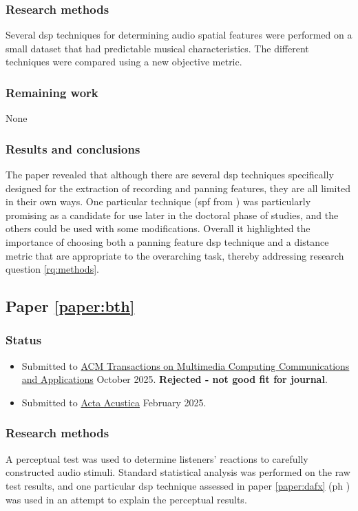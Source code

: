 \documentclass[a4paper]{article}
\begin{document}
\begin{refsection}
\subsubsection*{Research methods}
Several \gls{dsp} techniques for determining audio spatial features were performed on a small dataset that had predictable musical characteristics. The different techniques were compared using a new objective metric.

\subsubsection*{Remaining work}
None

\subsubsection*{Results and conclusions}
The paper revealed that although there are several \gls{dsp} techniques specifically designed for the extraction of recording and panning features, they are all limited in their own ways. One particular technique (\gls{spf} from \cite{tzanetakisStereoPanningFeatures2007}) was particularly promising as a candidate for use later in the doctoral phase of studies, and the others could be used with some modifications. Overall it highlighted the importance of choosing both a panning feature \gls{dsp} technique and a distance metric that are appropriate to the overarching task, thereby addressing research question \ref{rq:methods}.


\subsection*{Paper \ref{paper:bth}}
\textbf{}

\subsubsection*{Status}
\begin{itemize}
    \item Submitted to \href{https://dl.acm.org/journal/tomm}{ACM Transactions on Multimedia Computing Communications and Applications} October 2025. \textbf{Rejected - not good fit for journal}.
    \item Submitted to \href{https://acta-acustica.edpsciences.org/}{Acta Acustica} February 2025.
\end{itemize}

\subsubsection*{Research methods}
A perceptual test was used to determine listeners' reactions to carefully constructed audio stimuli. Standard statistical analysis was performed on the raw test results, and one particular \gls{dsp} technique assessed in paper \ref{paper:dafx} (\gls{ph} \cite{gomezMusicSimilaritySystems2008}) was used in an attempt to explain the perceptual results.


\end{refsection}
\end{document}
